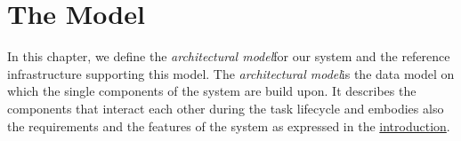 \chapter{The Model}
\label{cap:model}

















\newcommand{\model}{\emph{architectural model}}
In this chapter, we define the \model for our system and the reference
infrastructure supporting this model.
The \model is the data model on which the single components of the system are build upon.
It describes the components that interact each other during the task lifecycle and
embodies also the requirements and the features of the system as expressed in
the \hyperref[intro]{introduction}.\\



